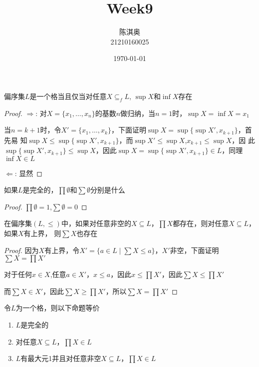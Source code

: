 \documentclass[11pt]{article}
\author{陈淇奥\\21210160025}
\date{\today}
\title{Week9}
\begin{document}
\maketitle
\begin{exercise}[2.1.7]
偏序集\(L\)是一个格当且仅当对任意\(X\subseteq_fL\), \(\sup X\)和\(\inf X\)存在
\end{exercise}

\begin{proof}
\(\Rightarrow\): 对\(X=\{x_1,\dots,x_n\}\)的基数\(n\)做归纳，当\(n=1\)时，\(\sup X=\inf X=x_1\)

当\(n=k+1\)时，令\(X'=\{x_1,\dots,x_k\}\)，下面证明\(\sup X​=\sup\{\sup X',x_{k+1}\}\)，首先易
知\(\sup X\le\sup\{\sup X',x_{k+1}\}\)，而\(\sup X'\le\sup X\),\(x_{k+1}\le\sup X\)，因
此\(\sup\{\sup X',x_{k+1}\}\le\sup X\)，因此\(\sup X=\sup\{\sup X',x_{k+1}\}\in L\)，同理\(\inf X\in L\)

\(\Leftarrow\): 显然
\end{proof}

\begin{exercise}[2.1.9]
如果\(L\)是完全的，\(\prod\emptyset\)和\(\sum\emptyset\)分别是什么
\end{exercise}

\begin{proof}
\(\prod\emptyset=1\),\(\sum\emptyset=0\)
\end{proof}

\begin{exercise}[2.1.10]
在偏序集\((L,\le)\)中，如果对任意非空的\(X\subseteq L\)，\(\prod X\)都存在，则对任意\(X\subseteq L\)，如果\(X\)有上界，
则\(\sum X\)也存在
\end{exercise}

\begin{proof}
因为\(X\)有上界，令\(X'=​\{a\in L\mid\sum X\le a\}\)，\(X'\)非空，下面证明\(\sum X=\prod X'\)

对于任何\(x\in X\),任意\(a\in X'\)，\(x\le a\)，因此\(x\le\prod X'\)，因此\(\sum X\le\prod X'\)

而\(\sum X\in X'\)，因此\(\sum X\ge\prod X'\)，所以\(\sum X=\prod X'\)
\end{proof}

\begin{exercise}[2.1.11]
令\(L\)为一个格，则以下命题等价
\begin{enumerate}
\item \(L\)是完全的
\item 对任意\(X\subseteq L\)，\(\prod X\in L\)
\item \(L\)有最大元1并且对任意非空\(X\subseteq L\)，\(\prod X\in L\)
\end{enumerate}
\end{exercise}
\end{document}
